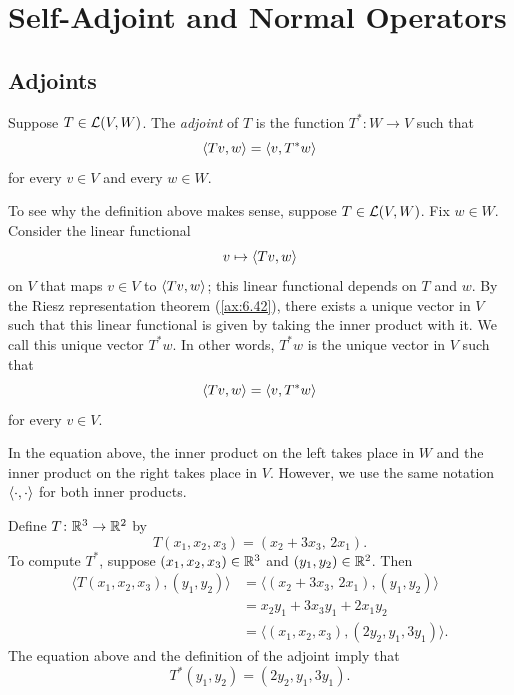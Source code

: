 \DeclareRobustCommand\axeqstep[1]{\refstepcounter{theorem}\label{#1}}
\section{Self-Adjoint and Normal Operators}

\subsection{Adjoints}

\begin{definition}[Adjoint, $T^*$]\label{ax:7.1}
Suppose $T\in\mathcal{L}(V,W)$. The \emph{adjoint} of $T$ is the function
$T^*\colon W\to V$ such that
\[ \langle Tv, w \rangle = \langle v, T^*w \rangle \]
for every $v\in V$ and every $w\in W$.
\end{definition}

%
To see why the definition above makes sense, suppose $T\in\mathcal{L}(V,W)$. Fix
$w\in W$. Consider the linear functional
\[ v\mapsto\langle Tv, w \rangle \]
on $V$ that maps $v\in V$ to $\langle Tv, w \rangle$; this linear functional depends on $T$
and $w$. By the Riesz representation theorem (\ref{ax:6.42}), there exists a
unique vector in $V$ such that this linear functional is given by taking the
inner product with it. We call this unique vector $T^*w$. In other words, $T^*w$
is the unique vector in $V$ such that
\[ \langle Tv, w \rangle = \langle v, T^*w \rangle \]
for every $v\in V$.

In the equation above, the inner product on the left takes place in $W$ and the
inner product on the right takes place in $V$. However, we use the same
notation $\langle \cdot, \cdot \rangle$ for both inner products.

\begin{example}\label{ax:7.2}
Define $T\colon\mathbb{R}^3\to\mathbb{R}^2$ by
\[ T(x_1,x_2,x_3) = (x_2+3x_3,\,2x_1). \]
To compute $T^*$, suppose $(x_1,x_2,x_3)\in\mathbb{R}^3$ and $(y_1,y_2)\in\mathbb{R}^2$. Then
\begin{align*}
\bigl\langle T(x_1,x_2,x_3),(y_1,y_2)\bigr\rangle
  &= \bigl\langle (x_2+3x_3,\,2x_1),(y_1,y_2)\bigr\rangle\\
  &= x_2y_1+3x_3y_1+2x_1y_2\\
  &= \bigl\langle (x_1,x_2,x_3),(2y_2,y_1,3y_1)\bigr\rangle.
\end{align*}
The equation above and the definition of the adjoint imply that
\[ T^*(y_1,y_2) = (2y_2,y_1,3y_1). \]
\end{example}

